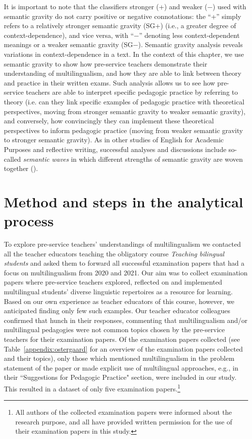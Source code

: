 \documentclass[output=paper]{langscibook}
\begin{document}
It is important to note that the classifiers stronger (+) and weaker (−) used with semantic gravity do not carry positive or negative connotations: the “+” simply refers to a relatively stronger semantic gravity (SG+) (i.e., a greater degree of context-dependence), and vice versa, with “−” denoting less context-dependent meanings or a weaker semantic gravity (SG−). Semantic gravity analysis reveals variations in context-dependence in a text. In the context of this chapter, we use semantic gravity to show how pre-service teachers demonstrate their understanding of multilingualism, and how they are able to link between theory and practice in their written exams. Such analysis allows us to see how pre-service teachers are able to interpret specific pedagogic practice by referring to theory (i.e. can they link specific examples of pedagogic practice with theoretical perspectives, moving from stronger semantic gravity to weaker semantic gravity), and conversely, how convincingly they can implement these theoretical perspectives to inform pedagogic practice (moving from weaker semantic gravity to stronger semantic gravity). As in other studies of English for Academic Purposes and reflective writing, successful analyses and discussions include so-called \textit{semantic waves} in which different strengths of semantic gravity are woven together (\citealt{Kirk2017, Meidell_sigsgaard2021, TilakaratnaSzenes2021}).

\section{Method and steps in the analytical process}

To explore pre-service teachers’ understandings of multilingualism we contacted all the teacher educators teaching the obligatory course \textit{Teaching bilingual students} and asked them to forward all successful examination papers that had a focus on multilingualism from 2020 and 2021. Our aim was to collect examination papers where pre-service teachers explored, reflected on and implemented multilingual students’ diverse linguistic repertoires as a resource for learning. Based on our own experience as teacher educators of this course, however, we anticipated finding only few such examples. Our teacher educator colleagues confirmed that hunch in their responses, commenting that multilingualism and\slash or multilingual pedagogies were not common topics chosen by the pre\hyp service teachers for their examination papers. Of the examination papers collected (see Table~\ref{appendix:ostergaard} for an overview of the examination papers collected and their topics), only those which mentioned multilingualism in the problem statement of the paper or made explicit use of multilingual approaches, e.g., in their ``Suggestions for Pedagogic Practice" section, were included in our study. This resulted in a dataset of only five examination papers.\footnote{All authors of the collected examination papers were informed about the research purpose, and all have provided written permission for the use of their examination papers in this study.}
\end{document}
